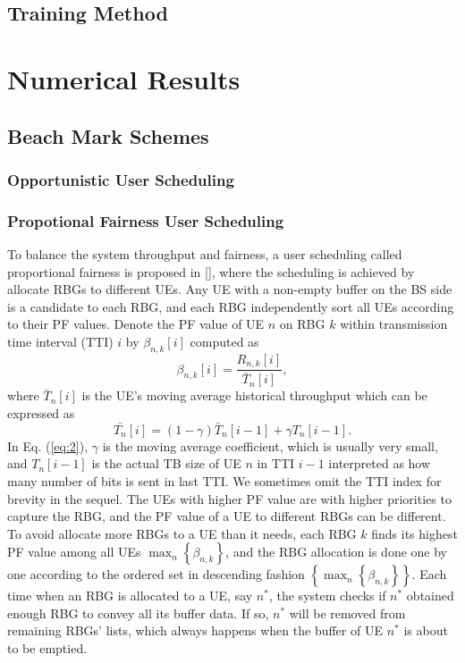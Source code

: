 \documentclass[conference,compsocconf]{IEEEtran}
\begin{document}
\subsection{Training Method}


\section{Numerical Results}

\subsection{Beach Mark Schemes}
\subsubsection{Opportunistic User Scheduling}
\subsubsection{Propotional Fairness User Scheduling}
To balance the system throughput and fairness, a user scheduling called proportional fairness is proposed in [], where the scheduling is achieved by allocate RBGs to different UEs. Any UE with a non-empty buffer on the BS side is a candidate to each RBG, and each RBG independently sort all UEs according to their PF values. Denote the PF value of UE $n$ on RBG $k$ within transmission time interval (TTI) $i$ by $\beta_{n,k}[i]$ computed as
\begin{equation}
\beta_{n,k}[i]=\frac{R_{n,k}[i]}{\bar{T}_n[i]},
\label{eq1}
\end{equation}
where $\bar{T}_n[i]$ is the UE's moving average historical throughput which can be expressed as
\begin{equation}
\bar{T_n}[i]=\left(1-\gamma\right)\bar{T}_n[i-1]+\gamma T_n[i-1].
\label{eq:2}
\end{equation}
In Eq. (\ref{eq:2}), $\gamma$ is the moving average coefficient, which is usually very small, and $T_n[i-1]$ is the actual TB size of UE $n$ in TTI $i-1$ interpreted as how many number of bits is sent in last TTI. We sometimes omit the TTI index for brevity in the sequel. The UEs with higher PF value are with higher priorities to capture the RBG, and the PF value of a UE to different RBGs can be different.  To avoid allocate more RBGs to a UE than it needs, each RBG $k$ finds its highest PF value among all UEs $\mathop{\max}_{n}\left\{\beta_{n,k}\right\}$, and the RBG allocation is done one by one according to the ordered set in descending fashion
$\left\{\mathop{\max}_{n}\left\{\beta_{n,k}\right\}\right\}$. Each time when an RBG is allocated to a UE, say $n^*$, the system checks if $n^*$ obtained enough RBG to convey all its buffer data. If so, $n^*$ will be removed from remaining RBGs' lists, which always happens when the buffer of UE $n^*$ is about to be emptied.
\end{document}
